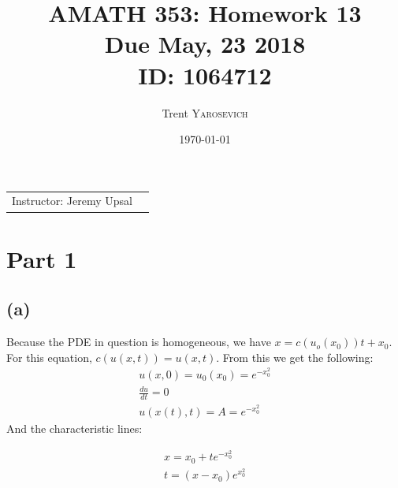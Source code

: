 \documentclass{article}
\title{AMATH 353: Homework 13 \\Due May, 23 2018 \\ ID: 1064712} %
\author{Trent \textsc{Yarosevich}} %
\date{\today} %
\begin{document}
\maketitle %
\setlength\parindent{1cm}

\begin{center}
\begin{tabular}{l r}
Instructor: Jeremy Upsal %
\end{tabular}
\end{center}


\section*{Part 1}
\subsection*{(a)}
Because the PDE in question is homogeneous, we have $x = c(u_o(x_0))t + x_0$. For this equation, $c(u(x,t)) = u(x, t)$. From this we get the following:
\begin{equation}
\begin{aligned}
u(x,0) = u_0(x_0) = e^{-x_0^2}\\
\frac{du}{dt} = 0\\
u(x(t), t) = A = e^{-x_0^2}
\end{aligned}
\end{equation}
And the characteristic lines:
\begin{tcolorbox}[minipage,colback=white,arc=0pt,outer arc=0pt]
\begin{equation}
\begin{aligned}
x = x_0 + te^{-x_0^2}\\
t = (x - x_0)e^{x_0^2}
\end{aligned}
\end{equation}
\end{tcolorbox}
\end{document}
